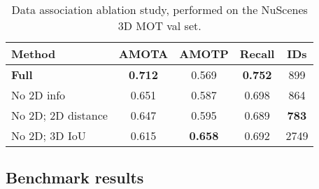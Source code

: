 \documentclass[letterpaper, 10 pt, conference]{ieeeconf}
\begin{document}
\begin{table}
\begin{center}


\begin{tabular}{l|c|c|c|c}

\toprule
Method & AMOTA & AMOTP & Recall & IDs \\
\hline\hline
\textbf{Full} & \textbf{0.712} & 0.569 & \textbf{0.752} & 899 \\
No 2D info & 0.651 & 0.587 & 0.698 & 864 \\
No 2D; 2D distance & 0.647 & 0.595 & 0.689 & \textbf{783} \\
No 2D; 3D IoU & 0.615 & \textbf{0.658} & 0.692 & 2749 \\


\bottomrule
\end{tabular}
\end{center}


\vspace{-7pt}
\caption{Data association ablation study, performed on the NuScenes 3D MOT val set.}
\label{tab:nuscenes_ablation}
\end{table}
 



\begin{table}
\scriptsize
\begin{center}
\end{center}
\vspace{-7pt}
\caption{Ablation on the effect of using different object detection sources (KITTI 2D MOT val set).}
\label{tab:kitti_ablation_source}
\end{table}
 


\subsection{Benchmark results}
\end{document}
